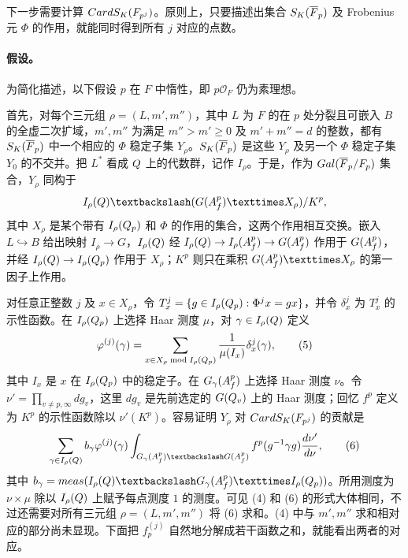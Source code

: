 下一步需要计算 $CardS_K(F_{p^j})$。原则上，只要描述出集合 $S_K(\overline{F}_p)$ 及 Frobenius 元 $\Phi$ 的作用，就能同时得到所有 $j$ 对应的点数。

\paragraph*{假设。}为简化描述，以下假设 $p$ 在 $F$ 中惰性，即 $p\mathcal O_F$ 仍为素理想。

首先，对每个三元组 $\rho=(L,m',m'')$，其中 $L$ 为 $F$ 的在 $p$ 处分裂且可嵌入 $B$ 的全虚二次扩域，$m',m''$ 为满足 $m''>m'\ge0$ 及 $m'+m''=d$ 的整数，都有 $S_K(\overline{F}_p)$ 中一个相应的 $\Phi$ 稳定子集 $Y_\rho$。$S_K(\overline{F}_p)$ 是这些 $Y_\rho$ 及另一个 $\Phi$ 稳定子集 $Y_0$ 的不交并。把 $L^*$ 看成 $Q$ 上的代数群，记作 $I_\rho$。于是，作为 $Gal(\overline{F}_p/F_p)$ 集合，$Y_\rho$ 同构于
\[
I_\rho(\Q)\backslash(G(\A_f^p)\times X_\rho)/K^p,
\]
其中 $X_\rho$ 是某个带有 $I_\rho(Q_p)$ 和 $\Phi$ 的作用的集合，这两个作用相互交换。嵌入 $L\hookrightarrow B$ 给出映射 $I_\rho\to G$，$I_\rho(Q)$ 经
$I_\rho(Q)\to I_\rho(A_f^p)\to G(A_f^p)$ 作用于 $G(A_f^p)$，并经 $I_\rho(Q)\to I_\rho(Q_p)$ 作用于 $X_\rho$；$K^p$ 则只在乘积 $G(\A_f^p)\times X_\rho$ 的第一因子上作用。

对任意正整数 $j$ 及 $x\in X_\rho$，令
$T_x^j=\{g\in I_\rho(Q_p):\Phi^jx=gx\}$，并令 $\delta_x^j$ 为 $T_x^j$ 的示性函数。在 $I_\rho(Q_p)$ 上选择 Haar 测度 $\mu$，对 $\gamma\in I_\rho(Q)$ 定义
\begin{equation}
\varphi^{(j)}(\gamma)=\sum_{x\in X_\rho\bmod I_\rho(Q_p)}\frac{1}{\mu(I_x)}\delta_x^j(\gamma),\tag{5}
\end{equation}
其中 $I_x$ 是 $x$ 在 $I_\rho(Q_p)$ 中的稳定子。在 $G_\gamma(A_f^p)$ 上选择 Haar 测度 $\nu$。令 $\nu'=\prod_{v\ne p,\infty}dg_v$，这里 $dg_v$ 是先前选定的 $G(Q_v)$ 上的 Haar 测度；回忆 $f^p$ 定义为 $K^p$ 的示性函数除以 $\nu'(K^p)$。容易证明 $Y_\rho$ 对 $CardS_K(F_{p^j})$ 的贡献是
\begin{equation}
\sum_{\gamma\in I_\rho(\Q)}b_\gamma\varphi^{(j)}(\gamma)
\int_{G_\gamma(\A_f^p)\backslash G(\A_f^p)}f^p(g^{-1}\gamma g)\frac{d\nu'}{d\nu},\tag{6}
\end{equation}
其中 $b_\gamma=\operatorname{meas}(I_\rho(\Q)\backslash G_\gamma(\A_f^p)\times I_\rho(\Q_p))$。所用测度为 $\nu\times\mu$ 除以 $I_\rho(Q)$ 上赋予每点测度 $1$ 的测度。可见 (4) 和 (6) 的形式大体相同，不过还需要对所有三元组 $\rho=(L,m',m'')$ 将 (6) 求和。(4) 中与 $m',m''$ 求和相对应的部分尚未显现。下面把 $f_p^{(j)}$ 自然地分解成若干函数之和，就能看出两者的对应。

